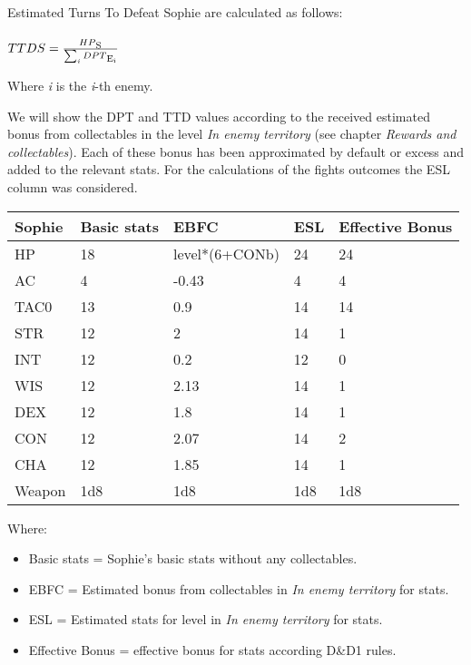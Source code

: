 Estimated Turns To Defeat Sophie are calculated as follows: \\\\
$TTDS=\frac{HP\textsubscript{S}}{\sum_{i}DPT\textsubscript{E\textsubscript{i}}}$

Where \textit{i} is the \textit{i}-th enemy.

We will show the DPT and TTD values according to the received estimated bonus from collectables in the level \textit{In enemy territory} (see chapter \textit{Rewards and collectables}). Each of these bonus has been approximated by default or excess and added to the relevant stats. For the calculations of the fights outcomes the ESL column was considered.
\begin{table}[H]
  \centering
\begin{tabular}{|l|l|l|l|l|}
\hline
\rowcolor[HTML]{C0C0C0} 
\textbf{Sophie} & \textbf{Basic stats} & \textbf{EBFC} & \textbf{ESL} & \textbf{Effective Bonus} \\ \hline
HP & 18 & level*(6+CONb) & 24 & 24 \\ \hline
AC & 4 & -0.43 & 4 & 4 \\ \hline
TAC0 & 13 & 0.9 & 14 & 14 \\ \hline
STR & 12 & 2 & 14 & 1 \\ \hline
INT & 12 & 0.2 & 12 & 0 \\ \hline
WIS & 12 & 2.13 & 14 & 1 \\ \hline
DEX & 12 & 1.8 & 14 & 1 \\ \hline
CON & 12 & 2.07 & 14 & 2 \\ \hline
CHA & 12 & 1.85 & 14 & 1 \\ \hline
Weapon & 1d8 & 1d8 & 1d8 & 1d8 \\ \hline
\end{tabular}
\end{table}
Where:
\begin{itemize}
	\item Basic stats = Sophie's basic stats without any collectables.
	\item EBFC = Estimated bonus from collectables in \textit{In enemy territory} for stats.
	\item ESL = Estimated stats for level in \textit{In enemy territory} for stats.
	\item Effective Bonus = effective bonus for stats according D\&{}D1 rules.
\end{itemize}

